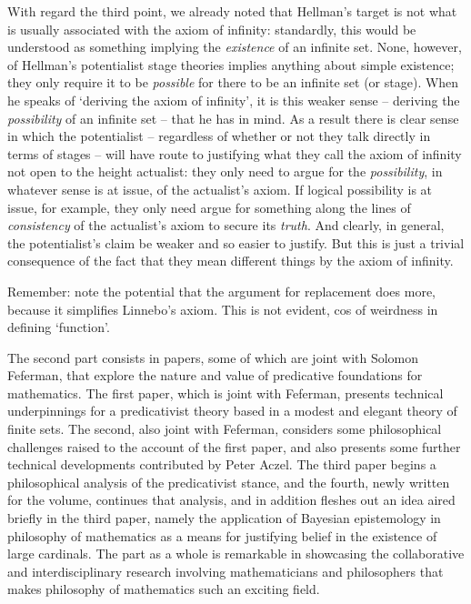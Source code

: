 \documentclass{asl}
\theoremstyle{definition}
\begin{document}
With regard the third point, we already noted that Hellman's target is not what is usually associated with the axiom of infinity: standardly, this would be understood as something implying the \emph{existence} of an infinite set. None, however, of Hellman's potentialist stage theories implies anything about simple existence; they only require it to be \emph{possible} for there to be an infinite set (or stage). When he speaks of `deriving the axiom of infinity', it is this weaker sense -- deriving the \emph{possibility} of an infinite set -- that he has in mind. As a result there is clear sense in which the potentialist -- regardless of whether or not they talk directly in terms of stages -- will have route to justifying what they call the axiom of infinity not open to the height actualist: they only need to argue for the \emph{possibility}, in whatever sense is at issue, of the actualist's axiom. If logical possibility is at issue, for example, they only need argue for something along the lines of \emph{consistency} of the actualist's axiom to secure its \emph{truth}. And clearly, in general, the potentialist's claim be weaker and so easier to justify. But this is just a trivial consequence of the fact that they mean different things by the axiom of infinity.

Remember: note the potential that the argument for replacement does more,
because it simplifies Linnebo's axiom. This is not evident, 
cos of weirdness in defining `function'.

The second part consists in papers, some of which are joint with Solomon Feferman, that explore the nature and value of predicative foundations for mathematics. The first paper, which is joint with Feferman, presents technical underpinnings for a predicativist theory based in a modest and elegant theory of finite sets. The second, also joint with Feferman, considers some philosophical challenges raised to the account of the first paper, and also presents some further technical developments contributed by Peter Aczel. The third paper begins a philosophical analysis of the predicativist stance, and the fourth, newly written for the volume, continues that analysis, and in addition fleshes out an idea aired briefly in the third paper, namely the application of Bayesian epistemology in philosophy of mathematics as a means for justifying belief in the existence of large cardinals. The part as a whole is remarkable in showcasing the collaborative and interdisciplinary research involving mathematicians and philosophers that makes philosophy of mathematics such an exciting field.
\end{document}
